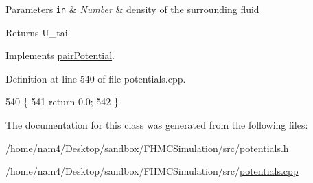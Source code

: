 \begin{DoxyParams}[1]{Parameters}
\mbox{\tt in}  & {\em Number} & density of the surrounding fluid\\
\hline
\end{DoxyParams}
\begin{DoxyReturn}{Returns}
U\-\_\-tail 
\end{DoxyReturn}


Implements \hyperlink{classpair_potential_a5387d21d8d487d1d42e9eaf7cae9175b}{pair\-Potential}.



Definition at line 540 of file potentials.\-cpp.


\begin{DoxyCode}
540                                                       \{
541     \textcolor{keywordflow}{return} 0.0;
542 \}
\end{DoxyCode}


The documentation for this class was generated from the following files\-:\begin{DoxyCompactItemize}
\item 
/home/nam4/\-Desktop/sandbox/\-F\-H\-M\-C\-Simulation/src/\hyperlink{potentials_8h}{potentials.\-h}\item 
/home/nam4/\-Desktop/sandbox/\-F\-H\-M\-C\-Simulation/src/\hyperlink{potentials_8cpp}{potentials.\-cpp}\end{DoxyCompactItemize}
